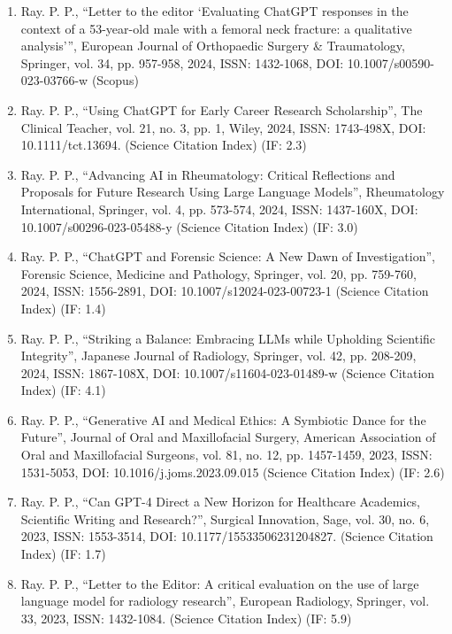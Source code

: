 \documentclass[11pt,a4paper]{moderncv}
\begin{document}
\begin{adjustwidth}{6em}{0pt}
\begin{enumerate}
		\item Ray. P. P., “Letter to the editor ‘Evaluating ChatGPT responses in the context of a 53-year-old male with a femoral neck fracture: a qualitative analysis’”, European Journal of Orthopaedic Surgery \& Traumatology, Springer, vol. 34, pp. 957-958, 2024, ISSN: 1432-1068, DOI: 10.1007/s00590-023-03766-w (Scopus) 
		
		\item Ray. P. P., “Using ChatGPT for Early Career Research Scholarship”, The Clinical Teacher, vol. 21, no. 3, pp. 1, Wiley, 2024, ISSN: 1743-498X, DOI: 10.1111/tct.13694. (Science Citation Index) (IF: 2.3)
		
		\item Ray. P. P., “Advancing AI in Rheumatology: Critical Reflections and Proposals for Future Research Using Large Language Models”, Rheumatology International, Springer, vol. 4, pp. 573-574, 2024, ISSN: 1437-160X, DOI: 10.1007/s00296-023-05488-y (Science Citation Index) (IF: 3.0)
		
		\item Ray. P. P., “ChatGPT and Forensic Science: A New Dawn of Investigation”, Forensic Science, Medicine and Pathology, Springer, vol. 20, pp. 759-760, 2024, ISSN: 1556-2891, DOI: 10.1007/s12024-023-00723-1 (Science Citation Index) (IF: 1.4)
		
		\item Ray. P. P., “Striking a Balance: Embracing LLMs while Upholding Scientific Integrity”, Japanese Journal of Radiology, Springer, vol. 42, pp. 208-209, 2024, ISSN: 1867-108X, DOI: 10.1007/s11604-023-01489-w (Science Citation Index) (IF: 4.1)
		
		\item Ray. P. P., “Generative AI and Medical Ethics: A Symbiotic Dance for the Future”, Journal of Oral and Maxillofacial Surgery, American Association of Oral and Maxillofacial Surgeons, vol. 81, no. 12, pp. 1457-1459, 2023, ISSN: 1531-5053, DOI: 10.1016/j.joms.2023.09.015 (Science Citation Index) (IF: 2.6)
		
		\item Ray. P. P., “Can GPT-4 Direct a New Horizon for Healthcare Academics, Scientific Writing and Research?”, Surgical Innovation, Sage, vol. 30, no. 6, 2023, ISSN: 1553-3514, DOI: 10.1177/15533506231204827. (Science Citation Index) (IF: 1.7)
		
		\item Ray. P. P., “Letter to the Editor: A critical evaluation on the use of large language model for radiology research”, European Radiology, Springer, vol. 33, 2023, ISSN: 1432-1084. (Science Citation Index) (IF: 5.9)
		

\end{enumerate}
\end{adjustwidth}
\end{document}
